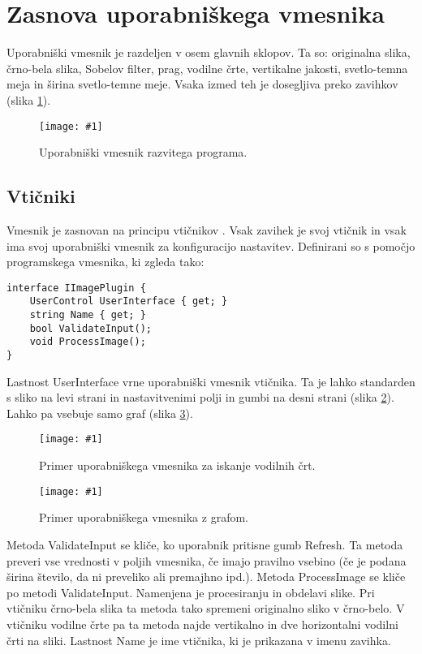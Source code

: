 \documentclass[oneside, a4paper, 12pt]{book}
\newcommand{\slika}[3]{
	\begin{figure}
	\begin{center}
	\texttt{[image: \#1]}
	\end{center}
	\vspace{-20pt}
	\caption{#2}
	\label{#3}
	\end{figure}
}
\begin{document}
\section{Zasnova uporabniškega vmesnika}
Uporabniški vmesnik je razdeljen v osem glavnih sklopov. Ta so: originalna slika, črno-bela slika, Sobelov filter, prag, vodilne črte, vertikalne jakosti, svetlo-temna meja in širina svetlo-temne meje. Vsaka izmed teh je dosegljiva preko zavihkov (slika \ref{pic:vmesnik1}).

\slika{slike/vmesnik-glavni.jpg}{Uporabniški vmesnik razvitega programa.}{pic:vmesnik1}

\subsection{Vtičniki}
Vmesnik je zasnovan na principu vtičnikov \cite{oreilly-dp, oreilly-cs}. Vsak zavihek je svoj vtičnik in vsak ima svoj uporabniški vmesnik za konfiguracijo nastavitev. Definirani so s pomočjo programskega vmesnika, ki zgleda tako:

\begin{samepage}
\begin{verbatim}
interface IImagePlugin {
    UserControl UserInterface { get; }
    string Name { get; }
    bool ValidateInput();
    void ProcessImage();
}
\end{verbatim}
\end{samepage}
Lastnost UserInterface vrne uporabniški vmesnik vtičnika. Ta je lahko standarden s sliko na levi strani in nastavitvenimi polji in gumbi na desni strani (slika \ref{pic:vmesnik2}). Lahko pa vsebuje samo graf (slika \ref{pic:vmesnik3}).

\slika{slike/vmesnik-slika-konfiguracija.jpg}{Primer uporabniškega vmesnika za iskanje vodilnih črt.}{pic:vmesnik2}

\slika{slike/vmesnik-samo-graf.jpg}{Primer uporabniškega vmesnika z grafom.}{pic:vmesnik3}

Metoda ValidateInput se kliče, ko uporabnik pritisne gumb Refresh. Ta metoda preveri vse vrednosti v poljih vmesnika, če imajo pravilno vsebino (če je podana širina število, da ni preveliko ali premajhno ipd.). Metoda ProcessImage se kliče po metodi ValidateInput. Namenjena je procesiranju in obdelavi slike. Pri vtičniku črno-bela slika ta metoda tako spremeni originalno sliko v črno-belo. V vtičniku vodilne črte pa ta metoda najde vertikalno in dve horizontalni vodilni črti na sliki. Lastnost Name je ime vtičnika, ki je prikazana v imenu zavihka.
\end{document}
